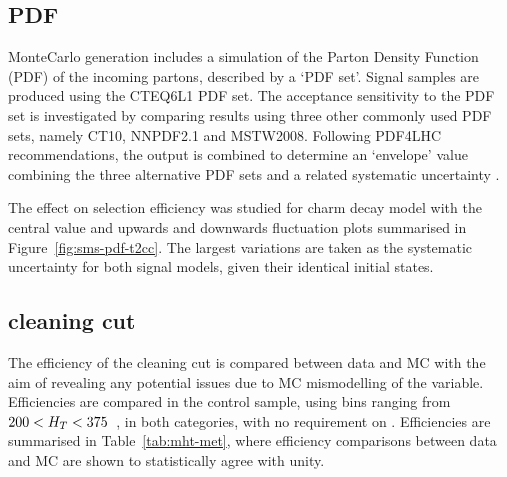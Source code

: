 \subsection{PDF}
MonteCarlo generation includes a simulation of the Parton Density Function (PDF)
of the incoming partons, described by a `PDF set'. Signal samples are produced
using the \textsc{CTEQ6L1} PDF set. The acceptance 
sensitivity to the PDF set is investigated by comparing results using three
other commonly used PDF sets, namely \textsc{CT10}, \textsc{NNPDF2.1} and
\textsc{MSTW2008}. Following PDF4LHC recommendations, the output is 
combined to determine an `envelope' value combining the three alternative PDF 
sets and a related systematic uncertainty \cite{pdf4lhc}.

The effect on selection efficiency was studied for charm decay model with the
central value and upwards and downwards fluctuation plots summarised in
Figure~\ref{fig:sms-pdf-t2cc}. The largest variations are taken as the
systematic uncertainty for both signal models, given their identical initial
states.

\subsection{\mhtmet cleaning cut}
\label{sec:mhtmet_syst}
The efficiency of the \mhtmet cleaning cut is compared between data and MC with 
the aim of revealing any potential issues due to MC mismodelling of the 
variable. Efficiencies are compared in the \mj control sample, using \HT bins 
ranging from $200 < H_T < 375$~\gev, in both \nj categories, with no requirement
on \nb. Efficiencies are summarised in Table~\ref{tab:mht-met}, where 
efficiency comparisons between data and MC are shown to statistically agree
with unity.


